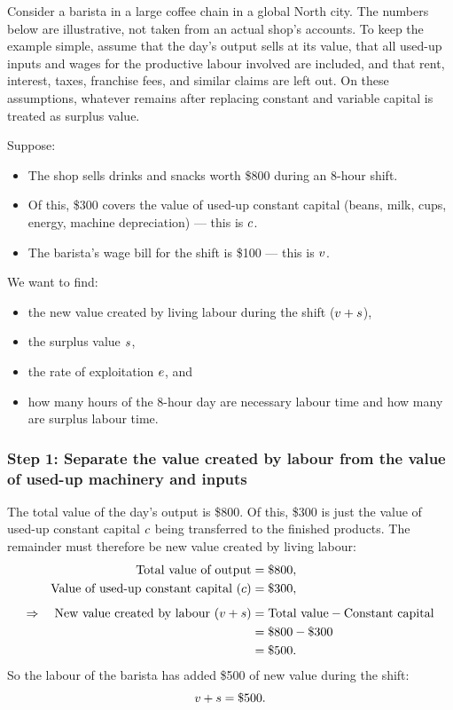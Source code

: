 Consider a barista in a large coffee chain in a global North city. The numbers below are illustrative, not taken from an actual shop's accounts. To keep the example simple, assume that the day's output sells at its value, that all used-up inputs and wages for the productive labour involved are included, and that rent, interest, taxes, franchise fees, and similar claims are left out. On these assumptions, whatever remains after replacing constant and variable capital is treated as surplus value.
\begin{example}
Suppose:

\begin{itemize}[leftmargin=1.5em]
  \item The shop sells drinks and snacks worth \$800 during an 8-hour shift.
  \item Of this, \$300 covers the value of used-up constant capital (beans, milk,
        cups, energy, machine depreciation) --- this is $c$.
  \item The barista's wage bill for the shift is \$100 --- this is $v$.
\end{itemize}

We want to find:

\begin{itemize}[leftmargin=1.5em]
  \item the new value created by living labour during the shift ($v + s$),
  \item the surplus value $s$,
  \item the rate of exploitation $e$, and
  \item how many hours of the 8-hour day are necessary labour time and how many
        are surplus labour time.
\end{itemize}

\subsubsection*{Step 1: Separate the value created by labour from the value of used-up machinery and inputs}

The total value of the day's output is \$800.  Of this, \$300 is just the value of
used-up constant capital $c$ being transferred to the finished products.
The remainder must therefore be new value created by living labour:
\begin{align*}
  \text{Total value of output} &= \$800,\\
  \text{Value of used-up constant capital } (c) &= \$300,\\[0.5em]
  \Rightarrow\quad
  \text{New value created by labour } (v + s)
    &= \text{Total value} - \text{Constant capital}\\
    &= \$800 - \$300\\
    &= \$500.
\end{align*}
So the labour of the barista has added \$500 of new value during the shift:
\[
  v + s = \$500.
\]


\end{example}
